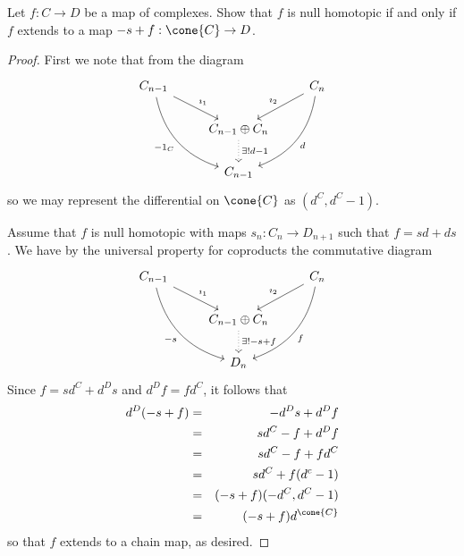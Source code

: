 \documentclass[10pt]{amsart}
\begin{document}
\begin{ex}
  Let $f : C \rightarrow D$ be a map of complexes.
  Show that $f$ is null homotopic if and only if $f$ extends to a map $-s + f : \cone{C} \rightarrow D$.
  
  \begin{proof}
    First we note that from the diagram
    $$\begin{tikzcd}
      C_{n-1}\arrow[bend right, swap]{rdd}{-1_C} \arrow{rd}{\imath_1} & & C_n \arrow[swap]{ld}{\imath_2} \arrow[bend left]{ldd}{d}\\
      & C_{n-1} \oplus C_n \arrow[dotted]{d}{\exists ! d - 1}& \\
      & C_{n-1} &
    \end{tikzcd}$$
    so we may represent the differential on $\cone{C}$ as $(d^C, d^C - 1)$.
    
    Assume that $f$ is null homotopic with maps $s_n : C_n \rightarrow D_{n+1}$ such that $f = sd + ds$.
    We have by the universal property for coproducts the commutative diagram
    $$\begin{tikzcd}
      C_{n-1}\arrow[bend right, swap]{rdd}{-s} \arrow{rd}{\imath_1} & & C_n \arrow[swap]{ld}{\imath_2} \arrow[bend left]{ldd}{f}\\
      & C_{n-1} \oplus C_n \arrow[dotted]{d}{\exists ! -s + f}& \\
      & D_n &
    \end{tikzcd}$$
    Since $f = sd^C + d^Ds$ and $d^Df = fd^C$, it follows that 
    \begin{eqnarray*}
      d^D(-s + f) &=& -d^Ds + d^Df\\
      &=& sd^C - f + d^Df\\
      &=& sd^C - f + fd^C\\
      &=& sd^C + f(d^c - 1)\\
      &=& (-s + f)(-d^C, d^C - 1)\\
      &=& (-s + f)d^{\cone{C}}
    \end{eqnarray*}
    so that $f$ extends to a chain map, as desired.


\end{proof}
\end{ex}
\end{document}
